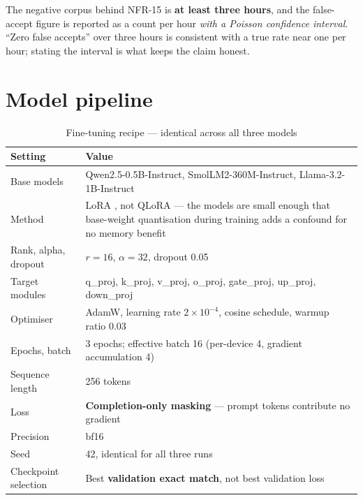 \documentclass[11pt,a4paper]{article}
\newcommand{\code}[1]{{\ttfamily\small #1}}
\begin{document}
The negative corpus behind NFR-15 is \textbf{at least three hours}, and the false-accept figure is reported
as a count per hour \emph{with a Poisson confidence interval}. ``Zero false accepts'' over three hours is
consistent with a true rate near one per hour; stating the interval is what keeps the claim honest.

\section{Model pipeline}
\label{sec:model}

\begin{table}[htbp]
\centering
\caption{Fine-tuning recipe --- identical across all three models}
\label{tab:lora}
\small
\begin{tabular}{@{}P{0.34}P{0.56}@{}}
\toprule
\textbf{Setting} & \textbf{Value} \\
\midrule
Base models          & Qwen2.5-0.5B-Instruct, SmolLM2-360M-Instruct, Llama-3.2-1B-Instruct \\
Method               & LoRA \cite{lora}, not QLoRA --- the models are small enough that base-weight
                       quantisation during training adds a confound for no memory benefit \\
Rank, alpha, dropout & $r = 16$, $\alpha = 32$, dropout 0.05 \\
Target modules       & \code{q\_proj}, \code{k\_proj}, \code{v\_proj}, \code{o\_proj},
                       \code{gate\_proj}, \code{up\_proj}, \code{down\_proj} \\
Optimiser            & AdamW, learning rate $2\times10^{-4}$, cosine schedule, warmup ratio 0.03 \\
Epochs, batch        & 3 epochs; effective batch 16 (per-device 4, gradient accumulation 4) \\
Sequence length      & 256 tokens \\
Loss                 & \textbf{Completion-only masking} --- prompt tokens contribute no gradient \\
Precision            & bf16 \\
Seed                 & 42, identical for all three runs \\
Checkpoint selection & Best \textbf{validation exact match}, not best validation loss \\
\bottomrule
\end{tabular}
\end{table}
\end{document}
